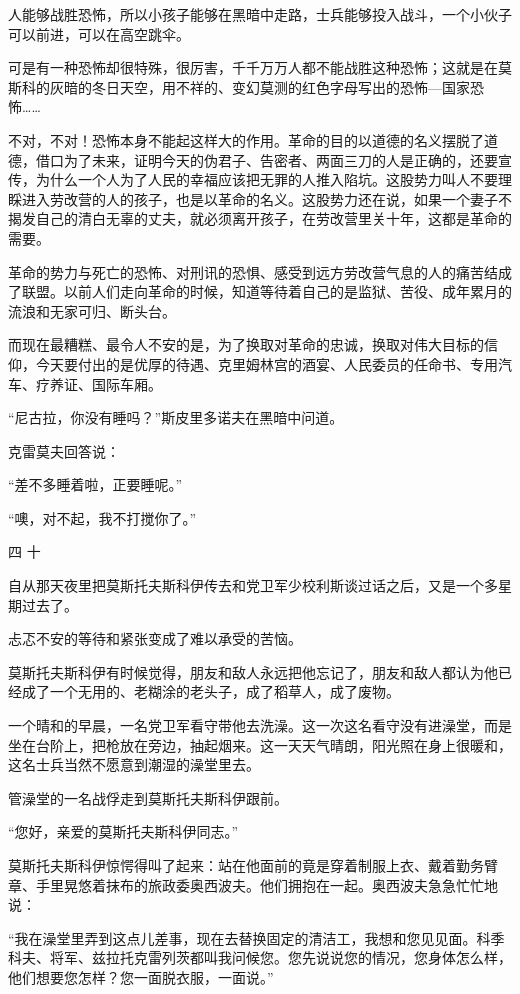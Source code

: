 人能够战胜恐怖，所以小孩子能够在黑暗中走路，士兵能够投入战斗，一个小伙子可以前进，可以在高空跳伞。

可是有一种恐怖却很特殊，很厉害，千千万万人都不能战胜这种恐怖；这就是在莫斯科的灰暗的冬日天空，用不祥的、变幻莫测的红色字母写出的恐怖—国家恐怖……

不对，不对！恐怖本身不能起这样大的作用。革命的目的以道德的名义摆脱了道德，借口为了未来，证明今天的伪君子、告密者、两面三刀的人是正确的，还要宣传，为什么一个人为了人民的幸福应该把无罪的人推入陷坑。这股势力叫人不要理睬进入劳改营的人的孩子，也是以革命的名义。这股势力还在说，如果一个妻子不揭发自己的清白无辜的丈夫，就必须离开孩子，在劳改营里关十年，这都是革命的需要。

革命的势力与死亡的恐怖、对刑讯的恐惧、感受到远方劳改营气息的人的痛苦结成了联盟。以前人们走向革命的时候，知道等待着自己的是监狱、苦役、成年累月的流浪和无家可归、断头台。

而现在最糟糕、最令人不安的是，为了换取对革命的忠诚，换取对伟大目标的信仰，今天要付出的是优厚的待遇、克里姆林宫的酒宴、人民委员的任命书、专用汽车、疗养证、国际车厢。

“尼古拉，你没有睡吗？”斯皮里多诺夫在黑暗中问道。

克雷莫夫回答说：

“差不多睡着啦，正要睡呢。”

“噢，对不起，我不打搅你了。”

四 十

自从那天夜里把莫斯托夫斯科伊传去和党卫军少校利斯谈过话之后，又是一个多星期过去了。

忐忑不安的等待和紧张变成了难以承受的苦恼。

莫斯托夫斯科伊有时候觉得，朋友和敌人永远把他忘记了，朋友和敌人都认为他已经成了一个无用的、老糊涂的老头子，成了稻草人，成了废物。

一个晴和的早晨，一名党卫军看守带他去洗澡。这一次这名看守没有进澡堂，而是坐在台阶上，把枪放在旁边，抽起烟来。这一天天气晴朗，阳光照在身上很暖和，这名士兵当然不愿意到潮湿的澡堂里去。

管澡堂的一名战俘走到莫斯托夫斯科伊跟前。

“您好，亲爱的莫斯托夫斯科伊同志。”

莫斯托夫斯科伊惊愕得叫了起来：站在他面前的竟是穿着制服上衣、戴着勤务臂章、手里晃悠着抹布的旅政委奥西波夫。他们拥抱在一起。奥西波夫急急忙忙地说：

“我在澡堂里弄到这点儿差事，现在去替换固定的清洁工，我想和您见见面。科季科夫、将军、兹拉托克雷列茨都叫我问候您。您先说说您的情况，您身体怎么样，他们想要您怎样？您一面脱衣服，一面说。”

